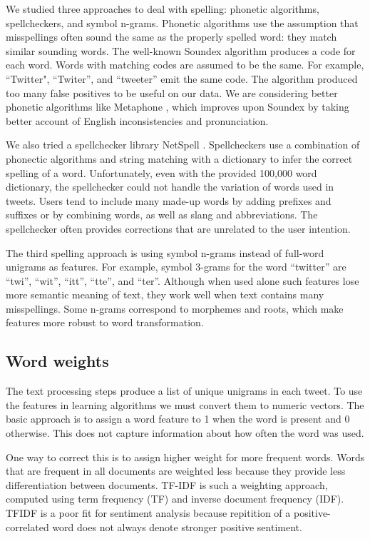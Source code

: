 We studied three approaches to deal with spelling: phonetic algorithms,
spellcheckers, and symbol n-grams. Phonetic algorithms use the assumption that
misspellings often sound the same as the properly spelled word: they match similar
sounding words. The well-known Soundex algorithm \cite{Jacobs:1982} produces a code for each
word. Words with matching codes are assumed to be the same. For example, ``Twitter", ``Twiter'', and ``tweeter'' emit the same code. The algorithm produced too many false positives to be useful on our data. We are considering better phonetic algorithms like Metaphone \cite{Philips:1990}, which improves upon Soundex by taking better account of English inconsistencies and pronunciation.

We also tried a spellchecker library NetSpell \cite{NetSpell}.
Spellcheckers use a combination of phonectic algorithms and string
matching with a dictionary to infer the correct spelling of a word.
Unfortunately, even with the provided 100,000 word dictionary, the
spellchecker could not handle the variation of words used in tweets.
Users tend to include many made-up words by adding prefixes and
suffixes or by combining words, as well as slang and abbreviations.
The spellchecker often provides corrections that are unrelated to the
user intention.

The third spelling approach is using symbol n-grams instead of
full-word unigrams as features. For example, symbol 3-grams for the
word ``twitter'' are ``twi'', ``wit'', ``itt'', ``tte'', and ``ter''.
Although when used alone such features lose more semantic meaning of
text, they work well when text contains many misspellings. Some n-grams
correspond to morphemes and roots, which make features more robust to
word transformation.

\subsection{Word weights}


The text processing steps produce a list of unique unigrams in each
tweet. To use the features in learning algorithms we must
convert them to numeric vectors. The basic approach is to 
assign a word feature to 1 when the word is present and 0 otherwise.
This does not capture information about how often the word was used.

One way to correct this is to assign higher weight for more
frequent words. Words that are frequent in all documents are weighted
less because they provide less differentiation between documents. TF-IDF
is such a weighting approach, computed using term frequency (TF) and
inverse document frequency (IDF). TFIDF is a poor fit for sentiment
analysis because repitition of a positive-correlated word does not always
denote stronger positive sentiment.


